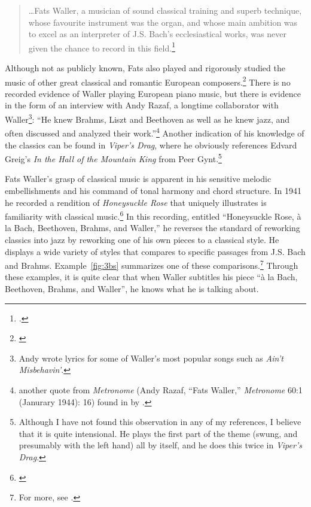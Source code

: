 \documentclass[11pt]{report}
\begin{document}
	\begin{quote}
		\ldots Fats Waller, a musician of sound classical training and superb technique, whose favourite instrument was the organ, and whose main ambition was to excel as an interpreter of J.S. Bach's ecclesiastical works, was never given the chance to record in this field.\footnote{\cite[209]{jazz_scene}.}
	\end{quote}
	
	Although not as publicly known, Fats also played and rigorously studied the music of other great classical and romantic European composers.\footnote{\cite[3]{life}} There is no recorded evidence of Waller playing European piano music, but there is evidence in the form of an interview with Andy Razaf, a longtime collaborator with Waller\footnote{Andy wrote lyrics for some of Waller's most popular songs such as \emph{Ain't Misbehavin'}.}: ``He knew Brahms, Liszt and Beethoven as well as he knew jazz, and often discussed and analyzed their work.''\footnote{another quote from \emph{Metronome} (Andy Razaf, ``Fats Waller,'' \emph{Metronome} 60:1 (Janurary 1944): 16) found in  by \cite{transcriptions}.} Another indication of his knowledge of the classics can be found in \emph{Viper's Drag}, where he obviously references Edvard Greig's \emph{In the Hall of the Mountain King} from Peer Gynt.\footnote{Although I have not found this observation in any of my references, I believe that it is quite intensional. He plays the first part of the theme (swung, and presumably with the left hand) all by itself, and he does this twice in \emph{Viper's Drag}.}
	
	Fats Waller's grasp of classical music is apparent in his sensitive melodic embellishments and his command of tonal harmony and chord structure. In 1941 he recorded a rendition of \emph{Honeysuckle Rose} that uniquely illustrates is familiarity with classical music.\footnote{\cite{transcriptions}} In this recording, entitled ``Honeysuckle Rose, \`a la Bach, Beethoven, Brahms, and Waller,'' he reverses the standard of reworking classics into jazz by reworking one of his own pieces to a classical style. He displays a wide variety of styles that \citeauthor{transcriptions} compares to specific passages from J.S. Bach and Brahms. Example~\ref{fig:3bs} summarizes one of these comparisons.\footnote{For more, see \cite{transcriptions}.} Through these examples, it is quite clear that when Waller subtitles his piece ``\`a la Bach, Beethoven, Brahms, and Waller'', he knows what he is talking about.
	
\end{document}
